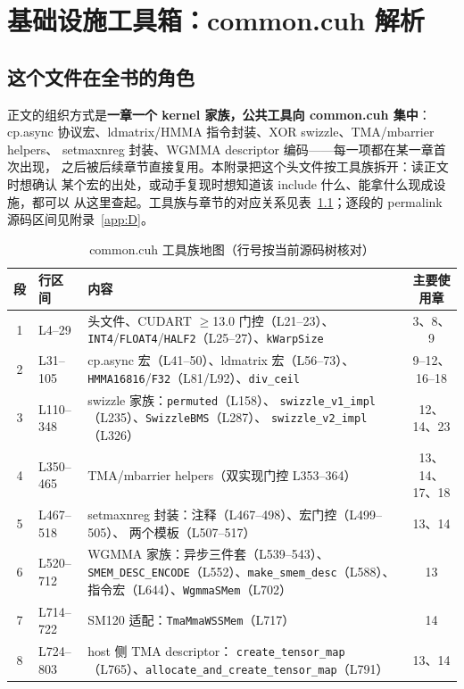 \chapter{基础设施工具箱：common.cuh 解析}\label{app:A}

\section{这个文件在全书的角色}

正文的组织方式是\textbf{一章一个 kernel 家族，公共工具向 common.cuh 集中}：
cp.async 协议宏、ldmatrix/HMMA 指令封装、XOR swizzle、TMA/mbarrier helpers、
setmaxnreg 封装、WGMMA descriptor 编码——每一项都在某一章首次出现，
之后被后续章节直接复用。本附录把这个头文件按工具族拆开：读正文时想确认
某个宏的出处，或动手复现时想知道该 include 什么、能拿什么现成设施，都可以
从这里查起。工具族与章节的对应关系见表~\ref{tab:appA-map}；逐段的 permalink
源码区间见附录~\ref{app:D}。

\begin{table}[htbp]
\centering\small
\caption{common.cuh 工具族地图（行号按当前源码树核对）}\label{tab:appA-map}
\begin{tabular}{clp{4.9cm}c}
\toprule
段 & 行区间 & 内容 & 主要使用章 \\
\midrule
1 & L4--29 & 头文件、CUDART $\ge$13.0 门控（L21--23）、
  \texttt{INT4}/\texttt{FLOAT4}/\texttt{HALF2}（L25--27）、\texttt{kWarpSize} & 3、8、9 \\
2 & L31--105 & cp.async 宏（L41--50）、ldmatrix 宏（L56--73）、
  \texttt{HMMA16816}/\texttt{F32}（L81/L92）、\texttt{div\_ceil} & 9--12、16--18 \\
3 & L110--348 & swizzle 家族：\texttt{permuted}（L158）、
  \texttt{swizzle\_\allowbreak{}v1\_\allowbreak{}impl}（L235）、\texttt{SwizzleBMS}（L287）、
  \texttt{swizzle\_\allowbreak{}v2\_\allowbreak{}impl}（L326） & 12、14、23 \\
4 & L350--465 & TMA/mbarrier helpers（双实现门控 L353--364） & 13、14、17、18 \\
5 & L467--518 & setmaxnreg 封装：注释（L467--498）、宏门控（L499--505）、
  两个模板（L507--517） & 13、14 \\
6 & L520--712 & WGMMA 家族：异步三件套（L539--543）、
  \texttt{SMEM\_\allowbreak{}DESC\_\allowbreak{}ENCODE}（L552）、\texttt{make\_\allowbreak{}smem\_\allowbreak{}desc}（L588）、
  指令宏（L644）、\texttt{WgmmaSMem}（L702） & 13 \\
7 & L714--722 & SM120 适配：\texttt{Tma\allowbreak{}Mma\allowbreak{}WSSMem}（L717） & 14 \\
8 & L724--803 & host 侧 TMA descriptor：
  \texttt{create\_\allowbreak{}tensor\_\allowbreak{}map}（L765）、\texttt{allocate\_\allowbreak{}and\_\allowbreak{}create\_\allowbreak{}tensor\_\allowbreak{}map}（L791） & 13、14 \\
\bottomrule
\end{tabular}
\end{table}

